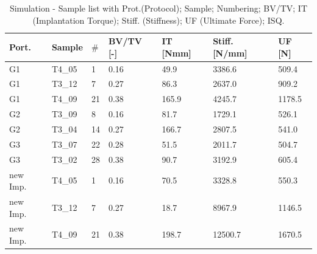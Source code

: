 \documentclass[12pt, a4paper, twoside]{report}
\begin{document}
\begin{table}[H]
    \begin{tabular}{l|l|l|l|l|l|l}

        Port.    & Sample & $\#$  & BV/TV [-] & IT [Nmm] & Stiff. [N/mm] & UF [N] \\ \hline
        G1       & T4\_05  & 1  & 0.16      & 49.9     & 3386.6        & 509.4  \\ 
        G1       & T3\_12  & 7  & 0.27      & 86.3     & 2637.0        & 909.2  \\ 
        G1       & T4\_09  & 21 & 0.38      & 165.9    & 4245.7        & 1178.5 \\ 
        G2       & T3\_09  & 8  & 0.16      & 81.7     & 1729.1        & 526.1  \\ 
        G2       & T3\_04  & 14 & 0.27      & 166.7    & 2807.5        & 541.0  \\ 
        G3       & T3\_07  & 22 & 0.28      & 51.5     & 2011.7        & 504.7  \\ 
        G3       & T3\_02  & 28 & 0.38      & 90.7     & 3192.9        & 605.4  \\ 
        new Imp. & T4\_05  & 1  & 0.16      & 70.5     & 3328.8        & 550.3  \\ 
        new Imp. & T3\_12  & 7  & 0.27      & 18.7     & 8967.9        & 1146.5 \\ 
        new Imp. & T4\_09  & 21 & 0.38      & 198.7    & 12500.7       & 1670.5 \\

    \end{tabular}
		\caption{Simulation - Sample list with Prot.(Protocol); Sample; Numbering; BV/TV; IT (Implantation Torque); Stiff. (Stiffness); UF (Ultimate Force); ISQ.}
		\label{tab:TabSamples_sim}
\end{table}

\newpage
%
%
%

%

%
\backmatter



\end{document}
